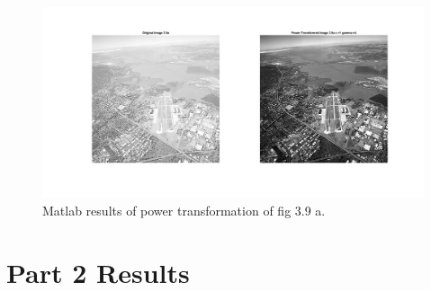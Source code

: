 \documentclass[./rarnold_report2.tex]{subfiles}
\begin{document}
\begin{enumerate}[a.]
	\begin{figure}[!htbp]
	\centering
	\includegraphics[scale=0.25]{"power_city"}
	\caption{Matlab results of power transformation of fig 3.9 a.} 
	\label{power_city}
	\end{figure}

\end{enumerate}

\section*{Part 2 Results}
\end{document}
